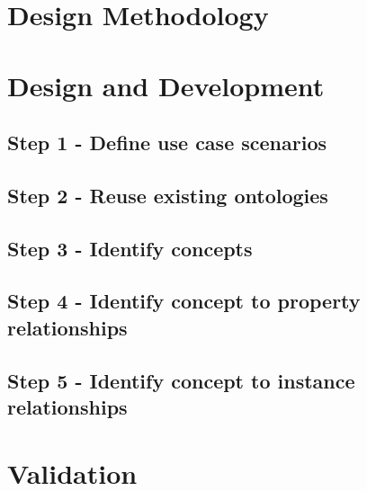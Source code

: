 \documentclass[12pt]{article}
\begin{document}
\newpage
\section{Design Methodology}

	
\newpage
\section{Design and Development}

\subsection{Step 1 - Define use case scenarios}


\subsection{Step 2 - Reuse existing ontologies}


\subsection{Step 3 - Identify concepts}


\subsection{Step 4 - Identify concept to property relationships}


\subsection{Step 5 - Identify concept to instance relationships}


\newpage
\section{Validation}

\end{document}
